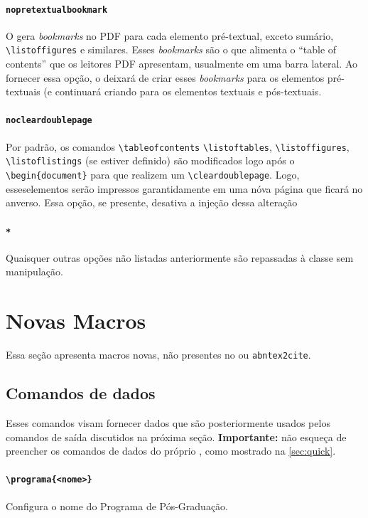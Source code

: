 \documentclass[embeddedlogo]{../ufsc-thesis-rn46-2019}
\newcommand{\lacmd}[1]{\texttt{\textbackslash{}#1}}
\begin{document}
\paragraph*{\texttt{nopretextualbookmark}} O \abnTeX{} gera \emph{bookmarks} no
PDF para cada elemento pré-textual, exceto sumário, \lacmd{listoffigures} e
similares. Esses \emph{bookmarks} são o que alimenta o ``table of contents'' que
os leitores PDF apresentam, usualmente em uma barra lateral.  Ao fornecer essa
opção, o \abnTeX{} deixará de criar esses \emph{bookmarks} para os elementos
pré-textuais (e continuará criando para os elementos textuais e pós-textuais.

\paragraph*{\texttt{nocleardoublepage}} Por padrão, os comandos
\lacmd{tableofcontents} \lacmd{listoftables}, \lacmd{listoffigures},
\lacmd{listoflistings} (se estiver definido) são modificados logo após o
\lacmd{begin\{document\}} para que realizem um \lacmd{cleardoublepage}. Logo,
esseselementos serão impressos garantidamente em uma nóva página que ficará no
anverso. Essa opção, se presente, desativa a injeção dessa alteração

\paragraph*{\texttt{*}} Quaisquer outras opções não listadas anteriormente são
repassadas à classe \abnTeX{} sem manipulação.

\section{Novas Macros}

Essa seção apresenta macros novas, não presentes no \abnTeX{} ou
\texttt{abntex2cite}.

\subsection{Comandos de dados}
\label{sec:dados}

Esses comandos visam fornecer dados que são posteriormente usados pelos
comandos de saída discutidos na próxima seção. \textbf{Importante:} não esqueça
de preencher os comandos de dados do próprio \abnTeX, como mostrado na
\autoref{sec:quick}.

\paragraph*{\lacmd{programa\{<nome>\}}} Configura o nome do Programa de
Pós-Graduação.
\end{document}
